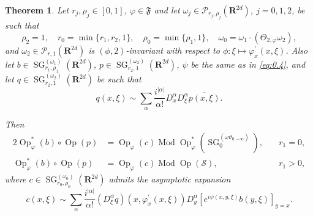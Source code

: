 \documentclass[12pt,a4paper,reqno]{amsart}
\numberwithin{equation}{section}
\newtheorem{thm}{Theorem}
\numberwithin{thm}{section}
\theoremstyle{definition}
\theoremstyle{remark}
\begin{document}
\begin{thm}
\label{thm:3.2}
Let $r_j,\rho _j\in [0,1]$, $\varphi \in {\mathfrak{F}}$ and let $\omega _j
\in {\mathscr P}_{r_j,\rho _j}({\mathbf R^{{2d}}})$, $j=0,1,2$, be such
that
$$
\rho _2=1,
\quad r_0=\min\{r_1,r_2,1\} ,\quad \rho _0=\min\{ \rho_1,1\},
\quad \omega _0 =\omega_1\cdot (\Theta _{2,{\varphi}} \omega _2),
$$
and $\omega _2\in \mathscr{P}_{r,1}({\mathbf R^{{2d}}})$ is
$(\phi,2)$-invariant with respect to $\phi \colon
\xi \mapsto \varphi ^\prime _x(x,\xi)$.
Also let $b \in {\operatorname{SG}}^{(\omega _1)} _{r_1,\rho_1}({\mathbf R^{{2d}}})$,
$p \in {\operatorname{SG}}^{(\omega _2)}_{r_2,1}({\mathbf R^{{2d}}})$, $\psi$
be the same as in \eqref{eq:0.4}, and let $q \in {\operatorname{SG}}^{(\omega _2)}
_{r_2,1}({\mathbf R^{{2d}}})$ be such that
\begin{equation}
\label{eq:1.11.2}
q(x,\xi)\sim\sum_{\alpha}\frac{i^{|\alpha|}}{\alpha!}D^\alpha_x D^\alpha_\xi\overline{p(x,\xi)}.
\end{equation}

Then
\begin{alignat*}{2}
{\operatorname{Op}} _\varphi ^*(b) \circ {\operatorname{Op}}(p) &= {\operatorname{Op}}_{\varphi}(c) \operatorname{Mod}
{\operatorname{Op}} _\varphi ^*({\operatorname{SG}} ^{(\omega \vartheta _{0,-\infty })}_0 ),& \quad r_1=0,
\\[1ex]
{\operatorname{Op}} _\varphi ^*(b) \circ {\operatorname{Op}}(p) &= {\operatorname{Op}}_{\varphi}(c) \operatorname{Mod}
{\operatorname{Op}} (\mathscr S ),& \quad r_1>0,
\end{alignat*}
where $c \in {\operatorname{SG}}^{(\omega _0)}_{r_0,\rho _0}({\mathbf R^{{2d}}})$
admits the asymptotic expansion
\begin{equation}
\label{eq:3.38}
c(x,\xi) \sim \sum_{\alpha} \frac{i^{|\alpha|}}{\alpha!} 
(D^\alpha_\xi q)(x, \varphi^\prime_x(x,\xi))
D^\alpha_y \!\!\left[ e^{i \psi(x,y,\xi)} b(y,\xi) \right ]_{y=x}.
\end{equation}
\end{thm}

\par
\end{document}
